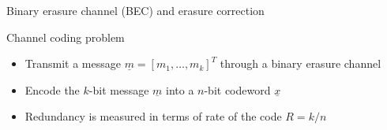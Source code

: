 \begin{frame}{Binary erasure channel (BEC) and erasure correction}

\begin{figure}[t]
\centering
\scalebox{0.55}{}
\end{figure}

\begin{block}{Channel coding problem}
\begin{itemize}
\item Transmit a message $\underline{m} = [m_1, \ldots, m_k]^T$ through a binary erasure channel
\item Encode the $k$-bit message $\underline{m}$ into a $n$-bit codeword $\underline{x}$
\item Redundancy is measured in terms of rate of the code $R = k/n$
\end{itemize}
\end{block}

\end{frame}

